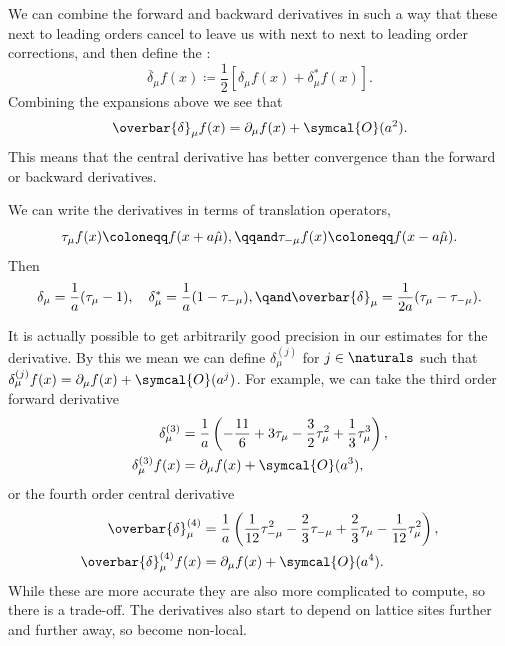 \documentclass[fleqn]{NotesClass}
\newcommand{\order}{\symcal{O}}
\newcommand{\forwardDerivative}{\delta}
\newcommand{\backwardDerivative}{\delta^*}
\newcommand{\centralDerivative}{\overbar{\delta}}
\begin{document}
    We can combine the forward and backward derivatives in such a way that these next to leading orders cancel to leave us with next to next to leading order corrections, and then define the :
    \begin{equation}
        \centralDerivative_\mu f(x) \coloneqq \frac{1}{2}[\forwardDerivative_\mu f(x) + \backwardDerivative_\mu f(x)].
    \end{equation}	
    Combining the expansions above we see that
    \begin{equation}
        \centralDerivative_\mu f(x) = \partial_\mu f(x) + \order(a^2).
    \end{equation}
    This means that the central derivative has better convergence than the forward or backward derivatives.
    
    We can write the derivatives in terms of translation operators,
    \begin{equation}
        \tau_\mu f(x) \coloneqq f(x + a\hat{\mu}), \qqand \tau_{-\mu} f(x) \coloneqq f(x - a\hat{\mu}).
    \end{equation}
    Then
    \begin{equation}
        \forwardDerivative_\mu = \frac{1}{a}(\tau_\mu - 1), \quad \backwardDerivative_\mu = \frac{1}{a}(1 - \tau_{-\mu}), \qand \centralDerivative_\mu = \frac{1}{2a}(\tau_\mu - \tau_{-\mu}).
    \end{equation}
    
    It is actually possible to get arbitrarily good precision in our estimates for the derivative.
    By this we mean we can define \(\delta_\mu^{(j)}\) for \(j \in \naturals\) such that \(\delta_\mu^{(j)}f(x) = \partial_\mu f(x) + \order(a^j)\).
    For example, we can take the third order forward derivative
    \begin{align}
        \forwardDerivative_\mu^{(3)} &= \frac{1}{a}\left( -\frac{11}{6} + 3\tau_\mu - \frac{3}{2}\tau_\mu^2 + \frac{1}{3}\tau_\mu^3 \right),\\
        \forwardDerivative_\mu^{(3)}f(x) &= \partial_\mu f(x) + \order(a^3),
    \end{align}
    or the fourth order central derivative
    \begin{align}
        \centralDerivative_\mu^{(4)} &= \frac{1}{a}\left( \frac{1}{12}\tau_{-\mu}^2 - \frac{2}{3}\tau_{-\mu} + \frac{2}{3}\tau_\mu - \frac{1}{12}\tau_\mu^2 \right),\\
        \centralDerivative_\mu^{(4)} f(x) &= \partial_\mu f(x) + \order(a^4).
    \end{align}
    While these are more accurate they are also more complicated to compute, so there is a trade-off.
    The derivatives also start to depend on lattice sites further and further away, so become non-local.
    
\end{document}
